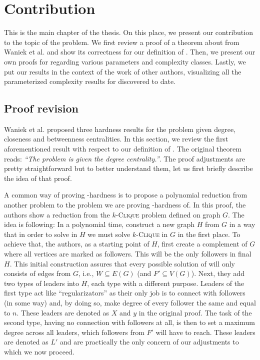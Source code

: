 \chapter{Contribution}\label{chapter:contribution}

This is the main chapter of the thesis.
On this place, we present our contribution to the topic of the \HL problem.
We first review a proof of a theorem about \HLdeg from Waniek et al. \cite{Waniek2017} and show
its correctness for our definition of \HL.
Then, we present our own proofs for \HLdeg regarding various parameters and complexity classes.
Lastly, we put our results in the context of the work of other authors,
visualizing all the parameterized complexity results for \HLdeg discovered to date.


\section{Proof revision}\label{section:proofRevision}

Waniek et al. \cite{Waniek2017} proposed three hardness results for the \HL problem given degree, closeness and betweenness
centralities. In this section, we review the first aforementioned result with respect to our definition of \HLshort.
The original theorem reads: \emph{``The \HL problem is \NPc given the degree centrality.''}.
The proof adjustments are pretty straightforward but to better understand them,
let us first briefly describe the idea of that proof.

A common way of proving \NP-hardness is to propose a polynomial reduction from another \NPh problem to the
problem we are proving \NP-hardness of.
In this proof, the authors show a reduction from the $k$-\textsc{Clique} problem defined on graph $G$.
The idea is following: In a polynomial time, construct a new graph $H$ from $G$ in a way that
in order to solve \HL in $H$ we must solve $k$-\textsc{Clique} in $G$ in the first place.
To achieve that, the authors, as a starting point of $H$, first create a complement of $G$ 
where all vertices are marked as followers. This will be the only followers in final $H$.
This initial construction assures that every possible solution of \HLshort will only consists of edges from $G$, i.e.,
$W \subseteq E(G)$ (and $F' \subseteq V(G)$).
Next, they add two types of leaders into $H$, each type with a different purpose.
Leaders of the first type act like ``regularizators'' as their only job is to connect with followers (in some way) and,
by doing so, make degree of every follower the same and equal to $n$.
These leaders are denoted as $X$ and $y$ in the original proof.
The task of the second type, having no connection with followers at all,
is then to set a maximum degree across all leaders, which followers from $F'$ will have to reach.
These leaders are denoted as $L'$ and are practically the only concern of our adjustments to which we now proceed.

